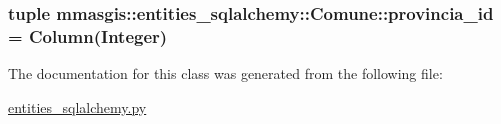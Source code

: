\label{classmmasgis_1_1entities__sqlalchemy_1_1Comune_a4172bd3523a11386f4e3fa72e99b1fb4}
\hypertarget{classmmasgis_1_1entities__sqlalchemy_1_1Comune_a13c3ed74087231f8bc9b9da82a8ab4c6}{
\subsubsection[{provincia\_\-id}]{\setlength{\rightskip}{0pt plus 5cm}tuple {\bf mmasgis::entities\_\-sqlalchemy::Comune::provincia\_\-id} = Column(Integer)}}
\label{classmmasgis_1_1entities__sqlalchemy_1_1Comune_a13c3ed74087231f8bc9b9da82a8ab4c6}


The documentation for this class was generated from the following file:\begin{DoxyCompactItemize}
\item 
\hyperlink{entities__sqlalchemy_8py}{entities\_\-sqlalchemy.py}\end{DoxyCompactItemize}
